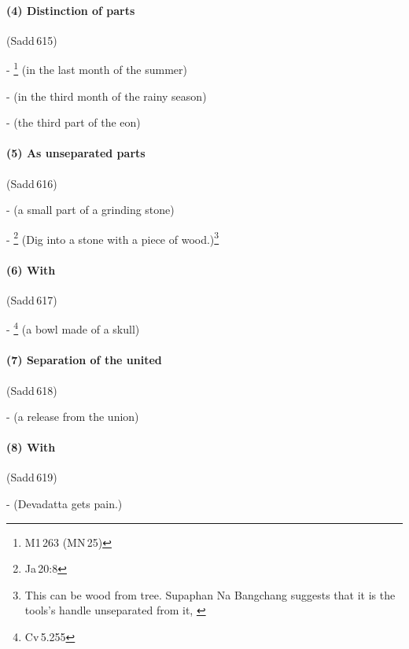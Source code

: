 \paragraph*{(4) Distinction of parts} (Sadd\,615)\par
- \footnote{M1\,263 (MN\,25)} (in the last month of the summer)\par
-  (in the third month of the rainy season)\par
-  (the third part of the eon)\par

\paragraph*{(5) As unseparated parts} (Sadd\,616)\par
-  (a small part of a grinding stone)\par
- \footnote{Ja\,20:8} (Dig into a stone with a piece of wood.)\footnote{This can be wood from  tree. Supaphan Na Bangchang suggests that it is the tools's handle unseparated from it, \citep[p.~327]{supaphan:pali}}\par

\paragraph*{(6) With } (Sadd\,617)\par
- \footnote{Cv\,5.255} (a bowl made of a skull)\par

\paragraph*{(7) Separation of the united} (Sadd\,618)\par
-  (a release from the union)\par

\paragraph*{(8) With } (Sadd\,619)\par
-  (Devadatta gets pain.)\par

